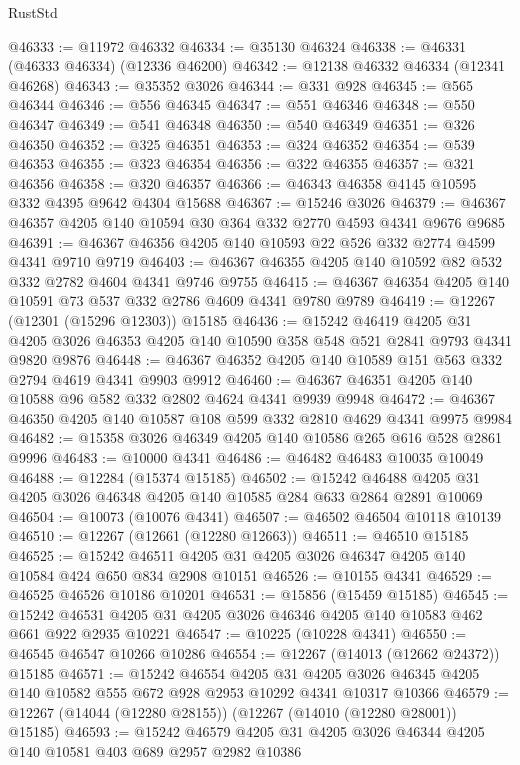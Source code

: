 \begin{lexlean}{RustStd}
\begin{coremodule}
@46333 := @11972 @46332
@46334 := @35130 @46324
@46338 := @46331 (@46333 @46334) (@12336 @46200)
@46342 := @12138 @46332 @46334 (@12341 @46268)
@46343 := @35352 @3026
@46344 := @331 @928
@46345 := @565 @46344
@46346 := @556 @46345
@46347 := @551 @46346
@46348 := @550 @46347
@46349 := @541 @46348
@46350 := @540 @46349
@46351 := @326 @46350
@46352 := @325 @46351
@46353 := @324 @46352
@46354 := @539 @46353
@46355 := @323 @46354
@46356 := @322 @46355
@46357 := @321 @46356
@46358 := @320 @46357
@46366 := @46343 @46358 @4145 @10595 @332 @4395 @9642 @4304 @15688
@46367 := @15246 @3026
@46379 := @46367 @46357 @4205 @140 @10594 @30 @364 @332 @2770 @4593 @4341 @9676 @9685
@46391 := @46367 @46356 @4205 @140 @10593 @22 @526 @332 @2774 @4599 @4341 @9710 @9719
@46403 := @46367 @46355 @4205 @140 @10592 @82 @532 @332 @2782 @4604 @4341 @9746 @9755
@46415 := @46367 @46354 @4205 @140 @10591 @73 @537 @332 @2786 @4609 @4341 @9780 @9789
@46419 := @12267 (@12301 (@15296 @12303)) @15185
@46436 := @15242
    @46419
    @4205
    @31
    @4205
    @3026
    @46353
    @4205
    @140
    @10590
    @358
    @548
    @521
    @2841
    @9793
    @4341
    @9820
    @9876
@46448 := @46367 @46352 @4205 @140 @10589 @151 @563 @332 @2794 @4619 @4341 @9903 @9912
@46460 := @46367 @46351 @4205 @140 @10588 @96 @582 @332 @2802 @4624 @4341 @9939 @9948
@46472 := @46367 @46350 @4205 @140 @10587 @108 @599 @332 @2810 @4629 @4341 @9975 @9984
@46482 := @15358 @3026 @46349 @4205 @140 @10586 @265 @616 @528 @2861 @9996
@46483 := @10000 @4341
@46486 := @46482 @46483 @10035 @10049
@46488 := @12284 (@15374 @15185)
@46502 := @15242 @46488 @4205 @31 @4205 @3026 @46348 @4205 @140 @10585 @284 @633 @2864 @2891 @10069
@46504 := @10073 (@10076 @4341)
@46507 := @46502 @46504 @10118 @10139
@46510 := @12267 (@12661 (@12280 @12663))
@46511 := @46510 @15185
@46525 := @15242 @46511 @4205 @31 @4205 @3026 @46347 @4205 @140 @10584 @424 @650 @834 @2908 @10151
@46526 := @10155 @4341
@46529 := @46525 @46526 @10186 @10201
@46531 := @15856 (@15459 @15185)
@46545 := @15242 @46531 @4205 @31 @4205 @3026 @46346 @4205 @140 @10583 @462 @661 @922 @2935 @10221
@46547 := @10225 (@10228 @4341)
@46550 := @46545 @46547 @10266 @10286
@46554 := @12267 (@14013 (@12662 @24372)) @15185
@46571 := @15242
    @46554
    @4205
    @31
    @4205
    @3026
    @46345
    @4205
    @140
    @10582
    @555
    @672
    @928
    @2953
    @10292
    @4341
    @10317
    @10366
@46579 := @12267 (@14044 (@12280 @28155)) (@12267 (@14010 (@12280 @28001)) @15185)
@46593 := @15242 @46579 @4205 @31 @4205 @3026 @46344 @4205 @140 @10581 @403 @689 @2957 @2982 @10386

\end{coremodule}
\end{lexlean}
